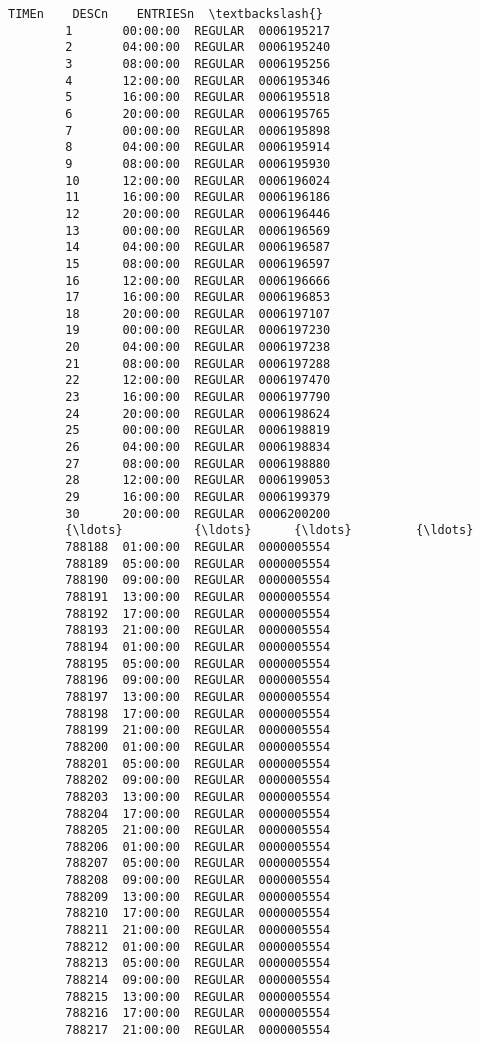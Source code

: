 \documentclass[11pt]{article}
\begin{document}
\begin{Verbatim}[commandchars=\\\{\}]
                   TIMEn    DESCn    ENTRIESn  \textbackslash{}
        1       00:00:00  REGULAR  0006195217   
        2       04:00:00  REGULAR  0006195240   
        3       08:00:00  REGULAR  0006195256   
        4       12:00:00  REGULAR  0006195346   
        5       16:00:00  REGULAR  0006195518   
        6       20:00:00  REGULAR  0006195765   
        7       00:00:00  REGULAR  0006195898   
        8       04:00:00  REGULAR  0006195914   
        9       08:00:00  REGULAR  0006195930   
        10      12:00:00  REGULAR  0006196024   
        11      16:00:00  REGULAR  0006196186   
        12      20:00:00  REGULAR  0006196446   
        13      00:00:00  REGULAR  0006196569   
        14      04:00:00  REGULAR  0006196587   
        15      08:00:00  REGULAR  0006196597   
        16      12:00:00  REGULAR  0006196666   
        17      16:00:00  REGULAR  0006196853   
        18      20:00:00  REGULAR  0006197107   
        19      00:00:00  REGULAR  0006197230   
        20      04:00:00  REGULAR  0006197238   
        21      08:00:00  REGULAR  0006197288   
        22      12:00:00  REGULAR  0006197470   
        23      16:00:00  REGULAR  0006197790   
        24      20:00:00  REGULAR  0006198624   
        25      00:00:00  REGULAR  0006198819   
        26      04:00:00  REGULAR  0006198834   
        27      08:00:00  REGULAR  0006198880   
        28      12:00:00  REGULAR  0006199053   
        29      16:00:00  REGULAR  0006199379   
        30      20:00:00  REGULAR  0006200200   
        {\ldots}          {\ldots}      {\ldots}         {\ldots}   
        788188  01:00:00  REGULAR  0000005554   
        788189  05:00:00  REGULAR  0000005554   
        788190  09:00:00  REGULAR  0000005554   
        788191  13:00:00  REGULAR  0000005554   
        788192  17:00:00  REGULAR  0000005554   
        788193  21:00:00  REGULAR  0000005554   
        788194  01:00:00  REGULAR  0000005554   
        788195  05:00:00  REGULAR  0000005554   
        788196  09:00:00  REGULAR  0000005554   
        788197  13:00:00  REGULAR  0000005554   
        788198  17:00:00  REGULAR  0000005554   
        788199  21:00:00  REGULAR  0000005554   
        788200  01:00:00  REGULAR  0000005554   
        788201  05:00:00  REGULAR  0000005554   
        788202  09:00:00  REGULAR  0000005554   
        788203  13:00:00  REGULAR  0000005554   
        788204  17:00:00  REGULAR  0000005554   
        788205  21:00:00  REGULAR  0000005554   
        788206  01:00:00  REGULAR  0000005554   
        788207  05:00:00  REGULAR  0000005554   
        788208  09:00:00  REGULAR  0000005554   
        788209  13:00:00  REGULAR  0000005554   
        788210  17:00:00  REGULAR  0000005554   
        788211  21:00:00  REGULAR  0000005554   
        788212  01:00:00  REGULAR  0000005554   
        788213  05:00:00  REGULAR  0000005554   
        788214  09:00:00  REGULAR  0000005554   
        788215  13:00:00  REGULAR  0000005554   
        788216  17:00:00  REGULAR  0000005554   
        788217  21:00:00  REGULAR  0000005554   
        

\end{Verbatim}
\end{document}
